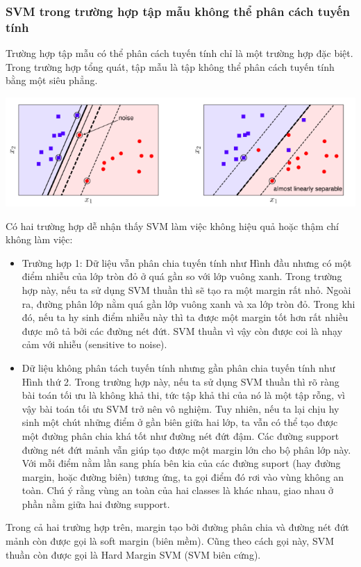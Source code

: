 \documentclass[12pt,a4paper]{article}
\begin{document}
\subsubsection{SVM trong trường hợp tập mẫu không thể phân cách tuyến tính}
Trường hợp tập mẫu có thể phân cách tuyến tính chỉ là một trường hợp đặc biệt. Trong trường hợp tổng quát, tập mẫu là tập không thể phân cách tuyến tính bằng một siêu phẳng.
\newpage
\begin{center}
    \includegraphics[scale=0.7]{img/img5.png}

\end{center}
Có hai trường hợp dễ nhận thấy SVM làm việc không hiệu quả hoặc thậm chí không làm việc:
\begin{itemize}
    \item Trường hợp 1: Dữ liệu vẫn phân chia tuyến tính như Hình đầu nhưng có một điểm nhiễu của lớp tròn đỏ ở quá gần so với lớp vuông xanh. Trong trường hợp này, nếu ta sử dụng SVM thuần thì sẽ tạo ra một margin rất nhỏ. Ngoài ra, đường phân lớp nằm quá gần lớp vuông xanh và xa lớp tròn đỏ. Trong khi đó, nếu ta hy sinh điểm nhiễu này thì ta được một margin tốt hơn rất nhiều được mô tả bởi các đường nét đứt. SVM thuần vì vậy còn được coi là nhạy cảm với nhiễu (sensitive to noise).
    \item Dữ liệu không phân tách tuyến tính nhưng gần phân chia tuyến tính như Hình thứ 2. Trong trường hợp này, nếu ta sử dụng SVM thuần thì rõ ràng bài toán tối ưu là không khả thi, tức tập khả thi của nó là một tập rỗng, vì vậy bài toán tối ưu SVM trở nên vô nghiệm. Tuy nhiên, nếu ta lại chịu hy sinh một chút những điểm ở gần biên giữa hai lớp, ta vẫn có thể tạo được một đường phân chia khá tốt như đường nét đứt đậm. Các đường support đường nét đứt mảnh vẫn giúp tạo được một margin lớn cho bộ phân lớp này. Với mỗi điểm nằm lần sang phía bên kia của các đường suport (hay đường margin, hoặc đường biên) tương ứng, ta gọi điểm đó rơi vào vùng không an toàn. Chú ý rằng vùng an toàn của hai classes là khác nhau, giao nhau ở phần nằm giữa hai đường support.
\end{itemize}
\indent Trong cả hai trường hợp trên, margin tạo bởi đường phân chia và đường nét đứt mảnh còn được gọi là soft margin (biên mềm). Cũng theo cách gọi này, SVM thuần còn được gọi là Hard Margin SVM (SVM biên cứng).\\
\end{document}
